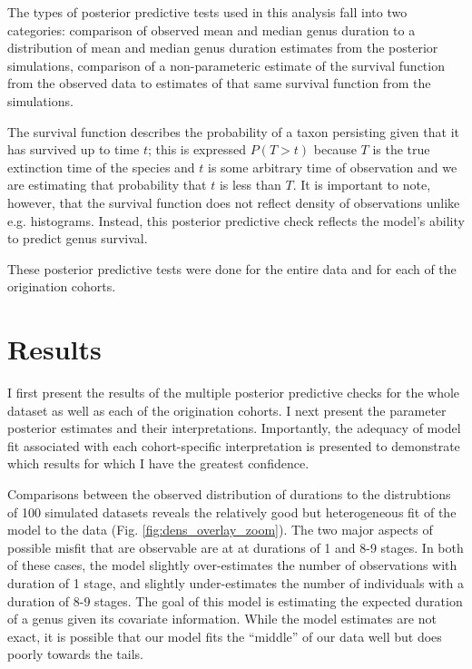 \documentclass[11pt]{article}
\begin{document}
The types of posterior predictive tests used in this analysis fall into two categories: comparison of observed mean and median genus duration to a distribution of mean and median genus duration estimates from the posterior simulations, comparison of a non-parameteric estimate of the survival function from the observed data to estimates of that same survival function from the simulations. 

The survival function describes the probability of a taxon persisting given that it has survived up to time \(t\); this is expressed \(P(T > t)\) because \(T\) is the true extinction time of the species and \(t\) is some arbitrary time of observation and we are estimating that probability that \(t\) is less than \(T\). It is important to note, however, that the survival function does not reflect density of observations unlike e.g. histograms. Instead, this posterior predictive check reflects the model's ability to predict genus survival.

These posterior predictive tests were done for the entire data and for each of the origination cohorts.







\section*{Results}
I first present the results of the multiple posterior predictive checks for the whole dataset as well as each of the origination cohorts. I next present the parameter posterior estimates and their interpretations. Importantly, the adequacy of model fit associated with each cohort-specific interpretation is presented to demonstrate which results for which I have the greatest confidence.


Comparisons between the observed distribution of durations to the distrubtions of 100 simulated datasets reveals the relatively good but heterogeneous fit of the model to the data (Fig. \ref{fig:dens_overlay_zoom}). The two major aspects of possible misfit that are observable are at at durations of 1 and 8-9 stages. In both of these cases, the model slightly over-estimates the number of observations with duration of 1 stage, and slightly under-estimates the number of individuals with a duration of 8-9 stages. The goal of this model is estimating the expected duration of a genus given its covariate information. While the model estimates are not exact, it is possible that our model fits the ``middle'' of our data well but does poorly towards the tails. 
\end{document}
